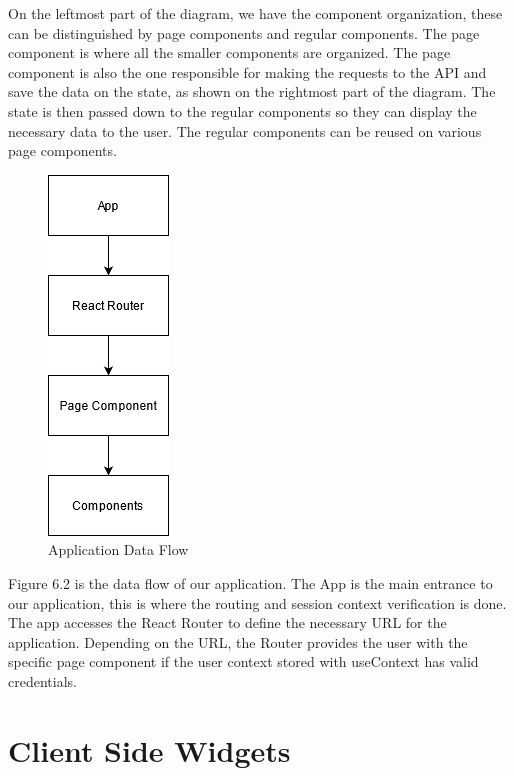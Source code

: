 \documentclass[a4paper,twoside,10pt]{report}
\begin{document}
On the leftmost part of the diagram, we have the component organization, these can be distinguished by page components and regular components.
The page component is where all the smaller components are organized. 
\newline
The page component is also the one responsible for making the requests to the API and save the data on the state, as shown on the rightmost part of the diagram.
\newline
The state is then passed down to the regular components so they can display the necessary data to the user.
The regular components can be reused on various page components.

\newpage
\begin{figure}[h!]
\center
  \includegraphics{client app interations.png}
\caption{Application Data Flow}
\end{figure}
Figure 6.2 is the data flow of our application.
The App is the main entrance to our application, this is where the routing and session context verification is done.
The app accesses the React Router to define the necessary URL for the application. Depending on the URL, the Router provides the user with the specific page component if the user context stored with useContext has valid credentials.

\section{Client Side Widgets}
\end{document}
